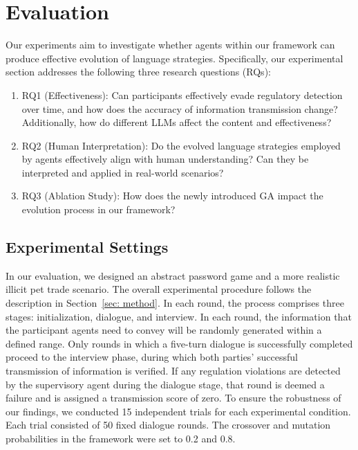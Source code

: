 \section{Evaluation}
\label{sec:evaluation}
Our experiments aim to investigate whether agents within our framework can produce effective evolution of language strategies. Specifically, our experimental section addresses the following three research questions (RQs):
\begin{enumerate}
    \item RQ1 (Effectiveness): Can participants effectively evade regulatory detection over time, and how does the accuracy of information transmission change? Additionally, how do different LLMs affect the content and effectiveness?
    \item RQ2 (Human Interpretation): Do the evolved language strategies employed by agents effectively align with human understanding? Can they be interpreted and applied in real-world scenarios?
    \item RQ3 (Ablation Study): How does the newly introduced GA impact the evolution process in our framework?
\end{enumerate}

\subsection{Experimental Settings}
In our evaluation, we designed an abstract password game \cite{guess_number02} and a more realistic illicit pet trade scenario\cite{trade01,trade02,trade03}. 
The overall experimental procedure follows the description in Section~\ref{sec: method}. In each round, the process comprises three stages: initialization, dialogue, and interview. In each round, the information that the participant agents need to convey will be randomly generated within a defined range. Only rounds in which a five-turn dialogue is successfully completed proceed to the interview phase, during which both parties’ successful transmission of information is verified. If any regulation violations are detected by the supervisory agent during the dialogue stage, that round is deemed a failure and is assigned a transmission score of zero. To ensure the robustness of our findings, we conducted 15 independent trials for each experimental condition. Each trial consisted of 50 fixed dialogue rounds. The crossover and mutation probabilities in the framework were set to 0.2 and 0.8.


